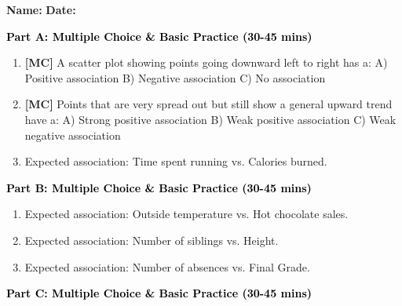\documentclass[12pt, letterpaper, fleqn]{article}
\newcommand{\blank}{\underline{\hspace{2.2cm}}}
\begin{document}
\textbf{Name:} \underline{\hspace{5cm}}
\hfill
\textbf{Date:} \underline{\hspace{3cm}}\\


\begin{tcolorbox}[colback=customteal!20]
\large\textcolor{black}{\textbf{Part A: Multiple Choice \& Basic Practice (30-45 mins)}}
\end{tcolorbox}

\vspace{3mm}

\begin{enumerate}[itemsep=2.5cm, leftmargin=0.6cm]
\item \textbf{[MC]} A scatter plot showing points going downward left to right has a:
A) Positive association B) Negative association C) No association
\item \textbf{[MC]} Points that are very spread out but still show a general upward trend have a:
A) Strong positive association B) Weak positive association C) Weak negative association
\item Expected association: Time spent running vs. Calories burned. \blank
\end{enumerate}

\newpage

\begin{tcolorbox}[colback=customteal!20]
\large\textcolor{black}{\textbf{Part B: Multiple Choice \& Basic Practice (30-45 mins)}}
\end{tcolorbox}

\vspace{3mm}

\begin{enumerate}[itemsep=2.5cm, leftmargin=0.6cm, resume]
\item Expected association: Outside temperature vs. Hot chocolate sales. \blank
\item Expected association: Number of siblings vs. Height. \blank
\item Expected association: Number of absences vs. Final Grade. \blank
\end{enumerate}

\newpage

\begin{tcolorbox}[colback=customteal!20]
\large\textcolor{black}{\textbf{Part C: Multiple Choice \& Basic Practice (30-45 mins)}}
\end{tcolorbox}
\end{document}
